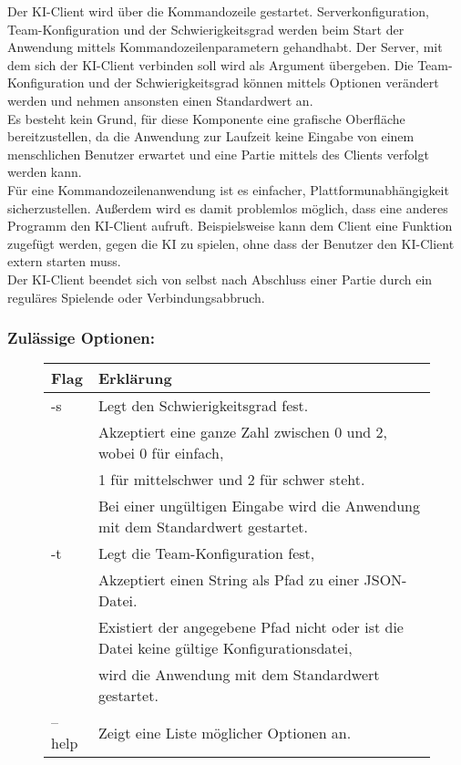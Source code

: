 Der KI-Client wird über die Kommandozeile gestartet. Serverkonfiguration, Team-Konfiguration und der Schwierigkeitsgrad werden beim Start der Anwendung mittels Kommandozeilenparametern gehandhabt. Der Server, mit dem sich der KI-Client verbinden soll wird als Argument übergeben. Die Team-Konfiguration und der Schwierigkeitsgrad können mittels Optionen verändert werden und nehmen ansonsten einen Standardwert an.\\
Es besteht kein Grund, für diese Komponente eine grafische Oberfläche bereitzustellen, da die Anwendung zur Laufzeit keine Eingabe von einem menschlichen Benutzer erwartet und eine Partie mittels des Clients verfolgt werden kann. \\
Für eine Kommandozeilenanwendung ist es einfacher, Plattformunabhängigkeit sicherzustellen. Außerdem wird es damit problemlos möglich, dass eine anderes Programm den KI-Client aufruft. Beispielsweise kann dem Client eine Funktion zugefügt werden, gegen die KI zu spielen, ohne dass der Benutzer den KI-Client extern starten muss.\\
Der KI-Client beendet sich von selbst nach Abschluss einer Partie durch ein reguläres Spielende oder Verbindungsabbruch.\\

\subsubsection{Zulässige Optionen:}
\begin{figure}[H]
    \centering
    \begin{tabular}{|p{2cm}|p{12cm} |}
        \hline
        Flag & Erklärung \\\hline
        -s & Legt den Schwierigkeitsgrad fest.\\
        & Akzeptiert eine ganze Zahl zwischen 0 und 2, wobei 0 für einfach,\\
        & 1 für mittelschwer und 2 für schwer steht.\\
        & Bei einer ungültigen Eingabe wird die Anwendung mit dem Standardwert gestartet.\\\hline
        -t & Legt die Team-Konfiguration fest,\\
        & Akzeptiert einen String als Pfad zu einer JSON-Datei.\\
        & Existiert der angegebene Pfad nicht oder ist die Datei keine gültige Konfigurationsdatei,\\
        & wird die Anwendung mit dem Standardwert gestartet.\\\hline
        --help & Zeigt eine Liste möglicher Optionen an.\\\hline
    \end{tabular}
\end{figure}
